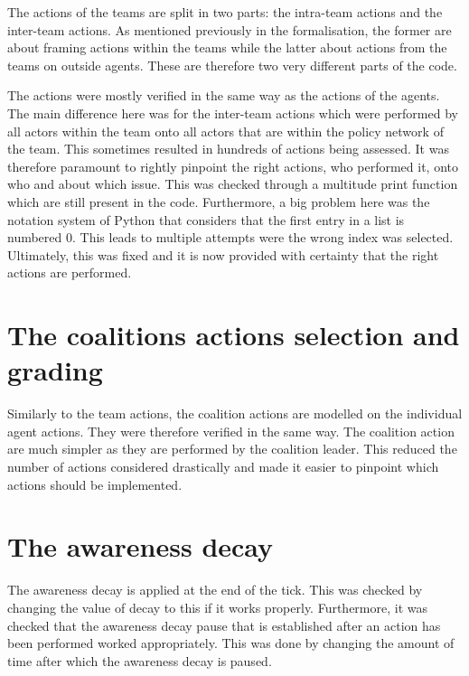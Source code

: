 The actions of the teams are split in two parts: the intra-team actions and the inter-team actions. As mentioned previously in the formalisation, the former are about framing actions within the teams while the latter about actions from the teams on outside agents. These are therefore two very different parts of the code.

The actions were mostly verified in the same way as the actions of the agents. The main difference here was for the inter-team actions which were performed by all actors within the team onto all actors that are within the policy network of the team. This sometimes resulted in hundreds of actions being assessed. It was therefore paramount to rightly pinpoint the right actions, who performed it, onto who and about which issue. This was checked through a multitude print function which are still present in the code. Furthermore, a big problem here was the notation system of Python that considers that the first entry in a list is numbered 0. This leads to multiple attempts were the wrong index was selected. Ultimately, this was fixed and it is now provided with certainty that the right actions are performed.

\section{The coalitions actions selection and grading}

Similarly to the team actions, the coalition actions are modelled on the individual agent actions. They were therefore verified in the same way. The coalition action are much simpler as they are performed by the coalition leader. This reduced the number of actions considered drastically and made it easier to pinpoint which actions should be implemented.

\section{The awareness decay}

The awareness decay is applied at the end of the tick. This was checked by changing the value of decay to this if it works properly. Furthermore, it was checked that the awareness decay pause that is established after an action has been performed worked appropriately. This was done by changing the amount of time after which the awareness decay is paused.


